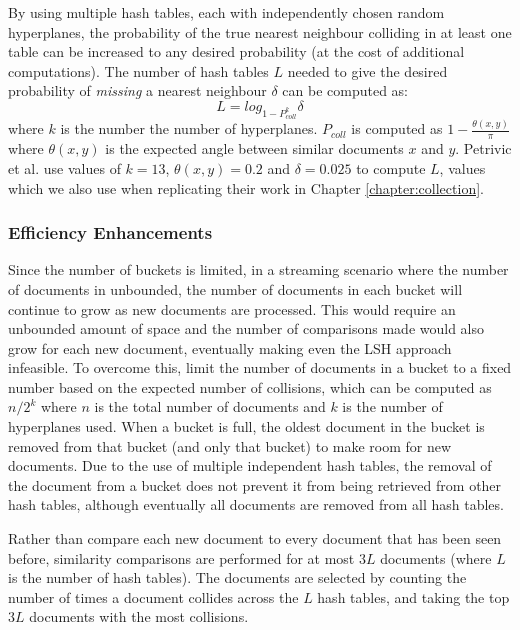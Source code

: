 By using multiple hash tables, each with independently chosen random hyperplanes, the probability of the true nearest neighbour colliding in at least one table can be increased to any desired probability (at the cost of additional computations).
The number of hash tables $L$ needed to give the desired probability of \emph{missing} a nearest neighbour $\delta$ can be computed as:
\begin{displaymath}
	L = log_{1-P^k_{coll}} \delta
\end{displaymath}
where $k$ is the number the number of hyperplanes. $P_{coll}$ is computed as $1-\frac{\theta(x,y)}{\pi}$ where $\theta(x,y)$ is the expected angle between similar documents $x$ and $y$.
Petrivic et al. use values of $k = 13$, $\theta(x,y) = 0.2$ and $\delta = 0.025$ to compute $L$, values which we also use when replicating their work in Chapter \ref{chapter:collection}.

\subsubsection{Efficiency Enhancements}
Since the number of buckets is limited, in a streaming scenario where the number of documents in unbounded, the number of documents in each bucket will continue to grow as new documents are processed.
This would require an unbounded amount of space and the number of comparisons made would also grow for each new document, eventually making even the LSH approach infeasible.
To overcome this, \cite{Petrovic:2010:SFS:1857999.1858020} limit the number of documents in a bucket to a fixed number based on the expected number of collisions, which can be computed as $n/2^k$ where $n$ is the total number of documents and $k$ is the number of hyperplanes used.
When a bucket is full, the oldest document in the bucket is removed from that bucket (and only that bucket) to make room for new documents.
Due to the use of multiple independent hash tables, the removal of the document from a bucket does not prevent it from being retrieved from other hash tables, although eventually all documents are removed from all hash tables.

Rather than compare each new document to every document that has been seen before, similarity comparisons are performed for at most $3L$ documents (where $L$ is the number of hash tables).
The documents are selected by counting the number of times a document collides across the $L$ hash tables, and taking the top $3L$ documents with the most collisions.

